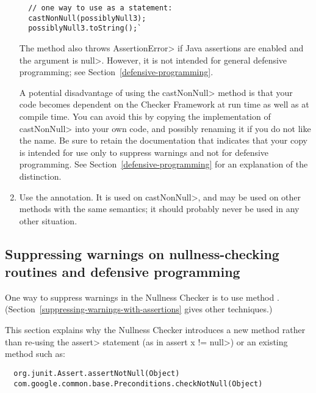 \begin{enumerate}
\begin{Verbatim}
  // one way to use as a statement:
  castNonNull(possiblyNull3);
  possiblyNull3.toString();`
\end{Verbatim}

  The method also throws \<AssertionError> if Java assertions are enabled and
  the argument is \<null>.  However, it is not intended for general defensive
  programming; see Section~\ref{defensive-programming}.

  A potential disadvantage of using the \<castNonNull> method is that your
  code becomes dependent on the Checker Framework at run time as well as at
  compile time.  You can avoid this by copying the implementation of
  \<castNonNull> into your own code, and possibly renaming it if you do not
  like the name.  Be sure to retain the documentation that indicates that
  your copy is intended for use only to suppress warnings and not for
  defensive programming.  See Section~\ref{defensive-programming} for an
  explanation of the distinction.

\item
  Use the 
  annotation.  It is used on \<castNonNull>, and may be used on other
  methods with the same semantics; it should probably never be used in any
  other situation.

\end{enumerate}


\subsection{Suppressing warnings on nullness-checking routines and defensive programming\label{defensive-programming}}

%


One way to suppress warnings in the Nullness Checker is to use
method .
(Section~\ref{suppressing-warnings-with-assertions} gives other techniques.)

This section explains why the Nullness Checker introduces a new method
rather than re-using the \<assert> statement (as in
\<assert x != null>) or an existing method such as:

\begin{Verbatim}
  org.junit.Assert.assertNotNull(Object)
  com.google.common.base.Preconditions.checkNotNull(Object)
\end{Verbatim}

